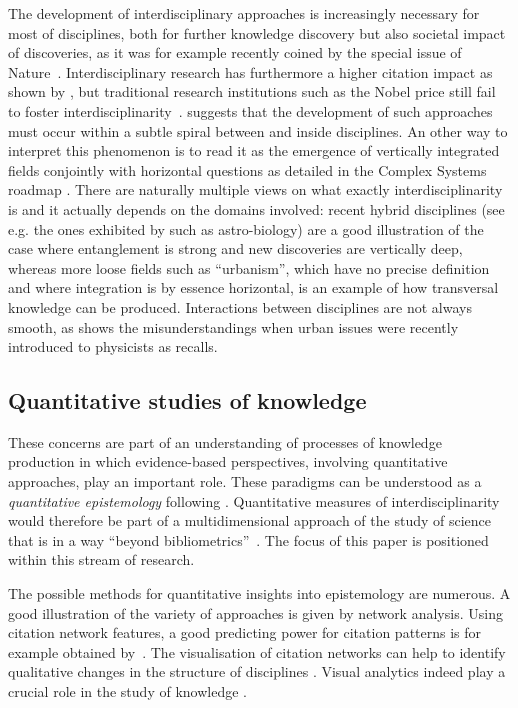 \documentclass[10pt]{article}
\begin{document}
The development of interdisciplinary approaches is increasingly necessary for most of disciplines, both for further knowledge discovery but also societal impact of discoveries, as it was for example recently coined by the special issue of Nature~\citep{natureInterdisc}. Interdisciplinary research has furthermore a higher citation impact as shown by \cite{CHEN20151034}, but traditional research institutions such as the Nobel price still fail to foster interdisciplinarity~\citep{szell2018nobel}. \cite{banos2013pour} suggests that the development of such approaches must occur within a subtle spiral between and inside disciplines. An other way to interpret this phenomenon is to read it as the emergence of vertically integrated fields conjointly with horizontal questions as detailed in the Complex Systems roadmap \citep{2009arXiv0907.2221B}. There are naturally multiple views on what exactly interdisciplinarity is and it actually depends on the domains involved: recent hybrid disciplines (see e.g. the ones exhibited by \cite{bais2010praise} such as astro-biology) are a good illustration of the case where entanglement is strong and new discoveries are vertically deep, whereas more loose fields such as ``urbanism'', which have no precise definition and where integration is by essence horizontal, is an example of how transversal knowledge can be produced. Interactions between disciplines are not always smooth, as shows the misunderstandings when urban issues were recently introduced to physicists as \cite{dupuy2015sciences} recalls.


\subsection*{Quantitative studies of knowledge}

These concerns are part of an understanding of processes of knowledge production in which evidence-based perspectives, involving quantitative approaches, play an important role. These paradigms can be understood as a \emph{quantitative epistemology} following \cite{chavalarias2013phylomemetic}. Quantitative measures of interdisciplinarity would therefore be part of a multidimensional approach of the study of science that is in a way ``beyond bibliometrics''~\citep{cronin2014beyond}. The focus of this paper is positioned within this stream of research.

The possible methods for quantitative insights into epistemology are numerous. A good illustration of the variety of approaches is given by network analysis. Using citation network features, a good predicting power for citation patterns is for example obtained by~\cite{2013arXiv1310.8220N}. The visualisation of citation networks can help to identify qualitative changes in the structure of disciplines \citep{chen2004searching}. Visual analytics indeed play a crucial role in the study of knowledge \citep{borner2003visualizing}.
\end{document}
